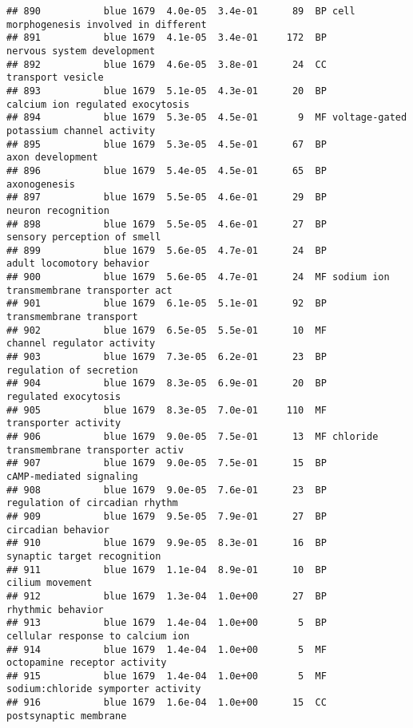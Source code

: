 \documentclass[]{article}
\begin{document}
\begin{verbatim}
## 890           blue 1679  4.0e-05  3.4e-01      89  BP cell morphogenesis involved in different
## 891           blue 1679  4.1e-05  3.4e-01     172  BP               nervous system development
## 892           blue 1679  4.6e-05  3.8e-01      24  CC                        transport vesicle
## 893           blue 1679  5.1e-05  4.3e-01      20  BP         calcium ion regulated exocytosis
## 894           blue 1679  5.3e-05  4.5e-01       9  MF voltage-gated potassium channel activity
## 895           blue 1679  5.3e-05  4.5e-01      67  BP                         axon development
## 896           blue 1679  5.4e-05  4.5e-01      65  BP                             axonogenesis
## 897           blue 1679  5.5e-05  4.6e-01      29  BP                       neuron recognition
## 898           blue 1679  5.5e-05  4.6e-01      27  BP              sensory perception of smell
## 899           blue 1679  5.6e-05  4.7e-01      24  BP                adult locomotory behavior
## 900           blue 1679  5.6e-05  4.7e-01      24  MF sodium ion transmembrane transporter act
## 901           blue 1679  6.1e-05  5.1e-01      92  BP                  transmembrane transport
## 902           blue 1679  6.5e-05  5.5e-01      10  MF               channel regulator activity
## 903           blue 1679  7.3e-05  6.2e-01      23  BP                  regulation of secretion
## 904           blue 1679  8.3e-05  6.9e-01      20  BP                     regulated exocytosis
## 905           blue 1679  8.3e-05  7.0e-01     110  MF                     transporter activity
## 906           blue 1679  9.0e-05  7.5e-01      13  MF chloride transmembrane transporter activ
## 907           blue 1679  9.0e-05  7.5e-01      15  BP                  cAMP-mediated signaling
## 908           blue 1679  9.0e-05  7.6e-01      23  BP           regulation of circadian rhythm
## 909           blue 1679  9.5e-05  7.9e-01      27  BP                       circadian behavior
## 910           blue 1679  9.9e-05  8.3e-01      16  BP              synaptic target recognition
## 911           blue 1679  1.1e-04  8.9e-01      10  BP                          cilium movement
## 912           blue 1679  1.3e-04  1.0e+00      27  BP                        rhythmic behavior
## 913           blue 1679  1.4e-04  1.0e+00       5  BP         cellular response to calcium ion
## 914           blue 1679  1.4e-04  1.0e+00       5  MF             octopamine receptor activity
## 915           blue 1679  1.4e-04  1.0e+00       5  MF       sodium:chloride symporter activity
## 916           blue 1679  1.6e-04  1.0e+00      15  CC                    postsynaptic membrane

\end{verbatim}
\end{document}
